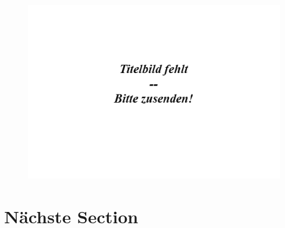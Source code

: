 \documentclass{doku2018}
\begin{document}
\begin{figure}
\begin{center}
\includegraphics[width=.9\columnwidth]{Titelbild-fehlt.png}
\label{fig:einnichtssagendeslabelnuetztniemandem}
\end{center}
\end{figure}


\blindtext
\section{Nächste Section}
\author{...}


\Blindtext

\Blindtext
\end{document}
